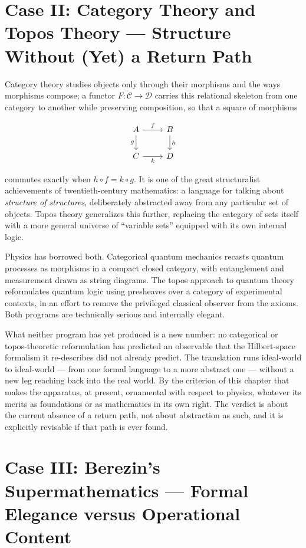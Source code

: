 \documentclass[11pt]{book}
\begin{document}
\section{Case II: Category Theory and Topos Theory --- Structure Without (Yet) a Return Path}

Category theory studies objects only through their morphisms and the ways morphisms compose; a functor $F: \mathcal{C} \to \mathcal{D}$ carries this relational skeleton from one category to another while preserving composition, so that a square of morphisms

\[
\begin{tikzcd}
A \arrow[r, "f"] \arrow[d, "g"'] & B \arrow[d, "h"] \\
C \arrow[r, "k"'] & D
\end{tikzcd}
\]

commutes exactly when $h \circ f = k \circ g$. It is one of the great structuralist achievements of twentieth-century mathematics: a language for talking about \emph{structure of structures}, deliberately abstracted away from any particular set of objects. Topos theory generalizes this further, replacing the category of sets itself with a more general universe of ``variable sets'' equipped with its own internal logic.

Physics has borrowed both. Categorical quantum mechanics recasts quantum processes as morphisms in a compact closed category, with entanglement and measurement drawn as string diagrams. The topos approach to quantum theory reformulates quantum logic using presheaves over a category of experimental contexts, in an effort to remove the privileged classical observer from the axioms. Both programs are technically serious and internally elegant.

What neither program has yet produced is a new number: no categorical or topos-theoretic reformulation has predicted an observable that the Hilbert-space formalism it re-describes did not already predict. The translation runs ideal-world to ideal-world --- from one formal language to a more abstract one --- without a new leg reaching back into the real world. By the criterion of this chapter that makes the apparatus, at present, ornamental with respect to physics, whatever its merits as foundations or as mathematics in its own right. The verdict is about the current absence of a return path, not about abstraction as such, and it is explicitly revisable if that path is ever found.

\section{Case III: Berezin's Supermathematics --- Formal Elegance versus Operational Content}
\end{document}
